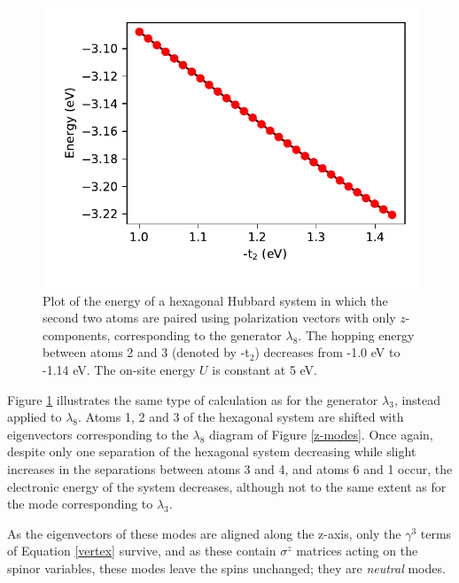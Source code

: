 \documentclass[prb,showpacs,superscriptaddress,titlepage,amsmath,amssymb,twocolumn]{revtex4-1}
\begin{document}
\begin{figure}
	\includegraphics[width=\columnwidth]{t2}
	\caption{Plot of the energy of a hexagonal Hubbard system in which the second two atoms are paired using polarization vectors with only $z$-components, corresponding to the generator $\lambda_{8}$. The hopping energy between atoms 2 and 3 (denoted by -t$_{2}$) decreases from -1.0 eV to -1.14 eV. The on-site energy $U$ is constant at 5 eV.}
	\label{t2}
\end{figure}

Figure \ref{t2} illustrates the same type of calculation as for the generator $\lambda_{3}$, instead applied to $\lambda_{8}$. Atoms 1, 2 and 3 of the hexagonal system are shifted with eigenvectors corresponding to the $\lambda_{8}$ diagram of Figure \ref{z-modes}. Once again, despite only one separation of the hexagonal system decreasing while slight increases in the separations between atoms 3 and 4, and atoms 6 and 1 occur, the electronic energy of the system decreases, although not to the same extent as for the mode corresponding to $\lambda_{3}$.

As the eigenvectors of these modes are aligned along the z-axis, only the $\gamma^{3}$ terms of Equation \ref{vertex} survive, and as these contain $\sigma^{z}$ matrices acting on the spinor variables, these modes leave the spins unchanged; they are \textit{neutral} modes.
\end{document}
